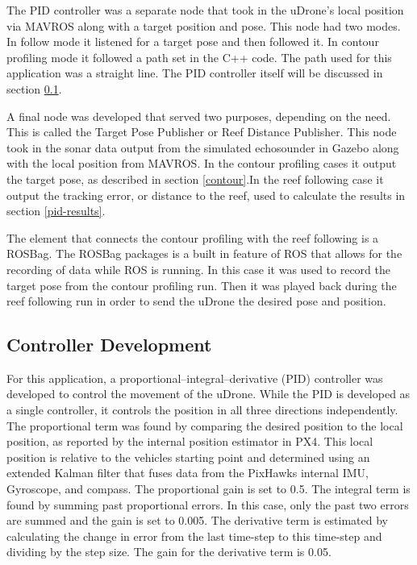 The PID controller was a separate node that took in the uDrone's local position via MAVROS along with a target position and pose. This node had two modes. In follow mode it listened for a target pose and then followed it. In contour profiling mode it followed a path set in the C++ code. The path used for this application was a straight line. The PID controller itself will be discussed in section \ref{controller}. 

A final node was developed that served two purposes, depending on the need. This is called the Target Pose Publisher or Reef Distance Publisher. This node took in the sonar data output from the simulated echosounder in Gazebo along with the local position from MAVROS. In the contour profiling cases it output the target pose, as described in section \ref{contour}.In the reef following case it output the tracking error, or distance to the reef, used to calculate the results in section \ref{pid-results}.

The element that connects the contour profiling with the reef following is a ROSBag. The ROSBag packages is a built in feature of ROS that allows for the recording of data while ROS is running. In this case it was used to record the target pose from the contour profiling run. Then it was played back during the reef following run in order to send the uDrone the desired pose and position. 

\subsection{Controller Development}\label{controller}

For this application, a proportional–integral–derivative (PID) controller was developed to control the movement of the uDrone. While the PID is developed as a single controller, it controls the position in all three directions independently. The proportional term was found by comparing the desired position to the local position, as reported by the internal position estimator in PX4. This local position is relative to the vehicles starting point and determined using an extended Kalman filter that fuses data from the PixHawks internal IMU, Gyroscope, and compass. The proportional gain is set to 0.5. The integral term is found by summing past proportional errors. In this case, only the past two errors are summed and the gain is set to 0.005. The derivative term is estimated by calculating the change in error from the last time-step to this time-step and dividing by the step size. The gain for the derivative term is 0.05. 

